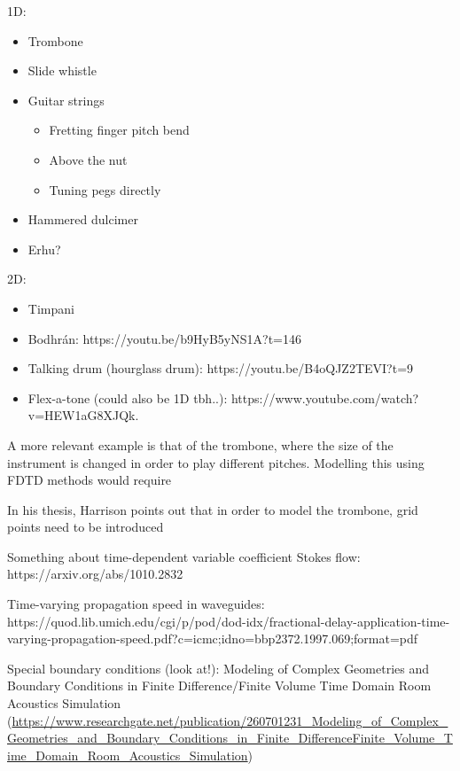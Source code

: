 \noindent 1D:
\begin{itemize}
    \item Trombone
    \item Slide whistle
    \item Guitar strings
    \begin{itemize}
        \item Fretting finger pitch bend
        \item Above the nut \cite{Mayer2008}
        \item Tuning pegs directly \cite{Gomm2011}
    \end{itemize}
    \item Hammered dulcimer \cite{Glenn2014}
    \item Erhu? 
\end{itemize}
%
2D: 
\begin{itemize}
    \item Timpani
    \item Bodhr\'an: https://youtu.be/b9HyB5yNS1A?t=146
    \item Talking drum (hourglass drum): https://youtu.be/B4oQJZ2TEVI?t=9
    \item Flex-a-tone (could also be 1D tbh..): https://www.youtube.com/watch?v=HEW1aG8XJQk.
\end{itemize}

A more relevant example is that of the trombone, where the size of the instrument is changed in order to play different pitches. Modelling this using FDTD methods would require



In his thesis, Harrison points out that in order to model the trombone, grid points need to be introduced 


Something about time-dependent variable coefficient Stokes flow:
https://arxiv.org/abs/1010.2832

Time-varying propagation speed in waveguides: https://quod.lib.umich.edu/cgi/p/pod/dod-idx/fractional-delay-application-time-varying-propagation-speed.pdf?c=icmc;idno=bbp2372.1997.069;format=pdf

Special boundary conditions (look at!):
Modeling of Complex Geometries and Boundary Conditions in Finite Difference/Finite Volume Time Domain Room Acoustics Simulation (\url{https://www.researchgate.net/publication/260701231_Modeling_of_Complex_Geometries_and_Boundary_Conditions_in_Finite_DifferenceFinite_Volume_Time_Domain_Room_Acoustics_Simulation})
